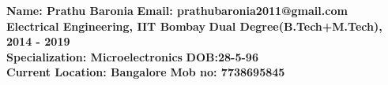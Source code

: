 \documentclass{resume}
\begin{document}

{\bf Name: Prathu Baronia} \hfill {\bf Email: prathubaronia2011@gmail.com}\\
{\bf Electrical Engineering, IIT Bombay} \hfill {\bf Dual Degree(B.Tech+M.Tech),
	2014 - 2019}\\
{\bf Specialization: Microelectronics} \hfill {\bf DOB:28-5-96}\\
{\bf Current Location: Bangalore} \hfill {\bf Mob no: 7738695845}\\

\vspace{-.4cm}
\end{document}
